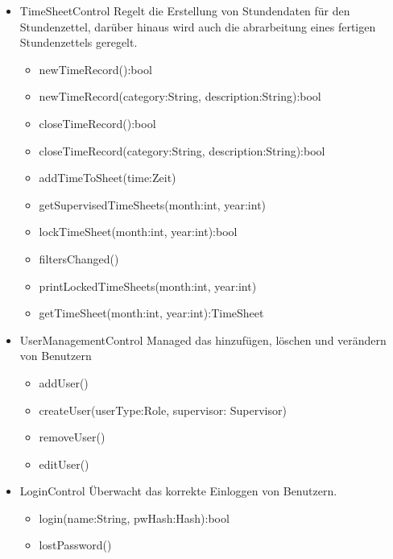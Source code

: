 \begin{itemize}
\begin{itemize}
\begin{itemize}
                    \item{TimeSheetControl}
                        Regelt die Erstellung von Stundendaten für den Stundenzettel, darüber hinaus wird auch die abrarbeitung eines fertigen Stundenzettels geregelt.
                        \begin{itemize}
                             \item{newTimeRecord():bool}
                             \item{newTimeRecord(category:String, description:String):bool}
                             \item{closeTimeRecord():bool}
                             \item{closeTimeRecord(category:String, description:String):bool}
                             \item{addTimeToSheet(time:Zeit)}
                             \item{getSupervisedTimeSheets(month:int, year:int)}
                             \item{lockTimeSheet(month:int, year:int):bool}
                             \item{filtersChanged()}
                             \item{printLockedTimeSheets(month:int, year:int)}
                             \item{getTimeSheet(month:int, year:int):TimeSheet}
                        \end{itemize}

                    \item{UserManagementControl}
                        Managed das hinzufügen, löschen und verändern von Benutzern
                        \begin{itemize}
                             \item{addUser()}
                             \item{createUser(userType:Role, supervisor: Supervisor)}
                             \item{removeUser()}
                             \item{editUser()}
                        \end{itemize}

                    \item{LoginControl}
                        Überwacht das korrekte Einloggen von Benutzern.
                        \begin{itemize}
                             \item{login(name:String, pwHash:Hash):bool}
                             \item{lostPassword()}
                        \end{itemize}


\end{itemize}
\end{itemize}
\end{itemize}
